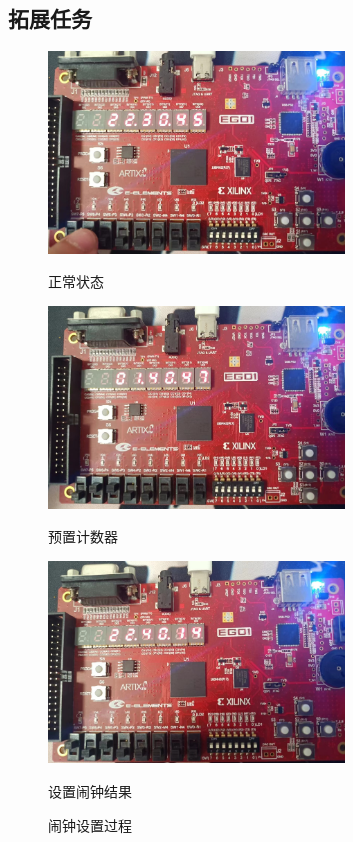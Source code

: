 \documentclass{article}
\begin{document}
\subsection*{拓展任务}
\begin{figure}[H]
    \begin{minipage}[t]{0.3\linewidth}
        \centering
        \includegraphics[width=0.7\textwidth]{image/2024-06-26-09-04-34.png}
        \caption{正常状态}
        \label{image_alarm_verify_1_1}
    \end{minipage}
    \begin{minipage}[t]{0.3\linewidth}
        \centering
        \includegraphics[width=0.7\textwidth]{image/2024-06-26-09-05-12.png}
        \caption{预置计数器}
        \label{image_alarm_verify_1_2}
    \end{minipage}
    \begin{minipage}[t]{0.3\linewidth}
        \centering
        \includegraphics[width=0.7\textwidth]{image/2024-06-26-09-05-49.png}
        \caption{设置闹钟结果}
        \label{image_alarm_verify_1_3}
    \end{minipage}
    \caption{闹钟设置过程}
    \label{image_alarm_verify_1}
\end{figure}
\end{document}
